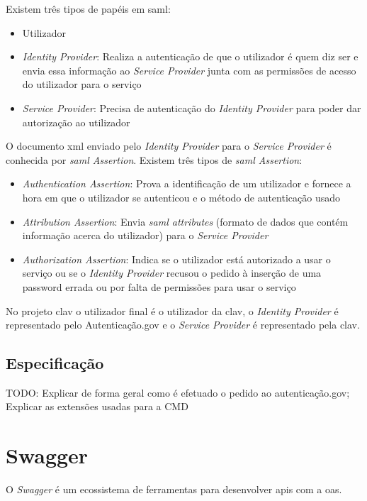 Existem três tipos de papéis em \acrshort{saml}:~\cite{wisaml}
\begin{itemize}[leftmargin=2cm]
    \item Utilizador
    \item \textit{Identity Provider}: Realiza a autenticação de que o utilizador é quem diz ser e envia essa informação ao \textit{Service Provider} junta com as permissões de acesso do utilizador para o serviço
    \item \textit{Service Provider}: Precisa de autenticação do \textit{Identity Provider} para poder dar autorização ao utilizador
\end{itemize}

O documento \acrshort{xml} enviado pelo \textit{Identity Provider} para o \textit{Service Provider} é conhecida por \textit{\acrshort{saml} Assertion}. Existem três tipos de \textit{\acrshort{saml} Assertion}:~\cite{wisaml}
\begin{itemize}[leftmargin=2cm]
    \item \textit{Authentication Assertion}: Prova a identificação de um utilizador e fornece a hora em que o utilizador se autenticou e o método de autenticação usado
    \item \textit{Attribution Assertion}: Envia \textit{\acrshort{saml} attributes} (formato de dados que contém informação acerca do utilizador) para o \textit{Service Provider}
    \item \textit{Authorization Assertion}: Indica se o utilizador está autorizado a usar o serviço ou se o \textit{Identity Provider} recusou o pedido à inserção de uma password errada ou por falta de permissões para usar o serviço
\end{itemize}

No projeto \acrshort{clav} o utilizador final é o utilizador da \acrshort{clav}, o \textit{Identity Provider} é representado pelo Autenticação.gov e o \textit{Service Provider} é representado pela \acrshort{clav}.

\subsection{Especificação}
TODO: Explicar de forma geral como é efetuado o pedido ao autenticação.gov; Explicar as extensões usadas para a CMD

\section{Swagger}
O \textit{Swagger} é um ecossistema de ferramentas para desenvolver \acrshort{api}s com a \acrfull{oas}.

